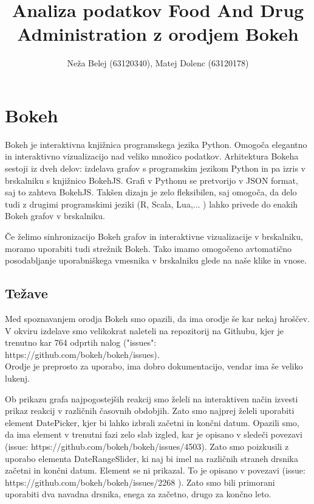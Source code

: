 \documentclass[a4paper,10pt]{article}
\title{Analiza podatkov Food And Drug Administration z orodjem Bokeh}
\author{Neža Belej (63120340), Matej Dolenc (63120178)}
\begin{document}
\maketitle
\pagebreak
\section {Bokeh}

Bokeh je interaktivna knjižnica programskega jezika Python. Omogoča elegantno in interaktivno vizualizacijo nad veliko množico podatkov.
Arhitektura Bokeha sestoji iz dveh delov: izdelava grafov s programskim jezikom Python in pa izris v brskalniku s knjižnico BokehJS. Grafi v Pythonu se pretvorijo v JSON format, saj to zahteva BokehJS. Takšen dizajn je zelo fleksibilen, saj omogoča, da delo tudi z drugimi programskimi jeziki (R, Scala, Lua,... ) lahko privede do enakih Bokeh grafov v brskalniku. 

Če želimo sinhronizacijo Bokeh grafov in interaktivne vizualizacije v brskalniku, moramo uporabiti tudi strežnik Bokeh. Tako imamo omogočeno avtomatično posodabljanje uporabniškega vmesnika v brskalniku glede na naše klike in vnose.

\subsection{Težave}
Med spoznavanjem orodja Bokeh smo opazili, da ima orodje še kar nekaj hroščev. V okviru izdelave smo velikokrat naleteli na repozitorij na Githubu, kjer je trenutno kar 764 odprtih nalog ("issues": https://github.com/bokeh/bokeh/issues). \\Orodje je preprosto za uporabo, ima dobro dokumentacijo, vendar ima še veliko lukenj. 

\vspace{5mm}
Ob prikazu grafa najpogostejših reakcij smo želeli na interaktiven način izvesti prikaz reakcij v različnih časovnih obdobjih.
Zato smo najprej želeli uporabiti element DatePicker, kjer bi lahko izbrali začetni in končni datum. Opazili smo, da ima element v trenutni fazi zelo slab izgled, kar je opisano v sledeči povezavi (issue: https://github.com/bokeh/bokeh/issues/4503). Zato smo poizkusili z uporabo elementa DateRangeSlider, ki naj bi imel na različnih straneh drsnika začetni in končni datum. Element se ni prikazal. To je opisano v povezavi (issue: https://github.com/bokeh/bokeh/issues/2268 ). Zato smo bili primorani uporabiti dva navadna drsnika, enega za začetno, drugo za končno leto. 
\end{document}
